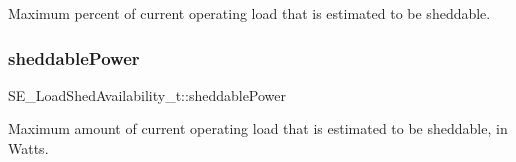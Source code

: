 Maximum percent of current operating load that is estimated to be sheddable. \mbox{\label{group__LoadShedAvailability_ga1a6b6f3e9fc1c6520221cce4af77712f}} 
\subsubsection{\texorpdfstring{sheddable\+Power}{sheddablePower}}
{\footnotesize\ttfamily S\+E\+\_\+\+Load\+Shed\+Availability\+\_\+t\+::sheddable\+Power}

Maximum amount of current operating load that is estimated to be sheddable, in Watts. 